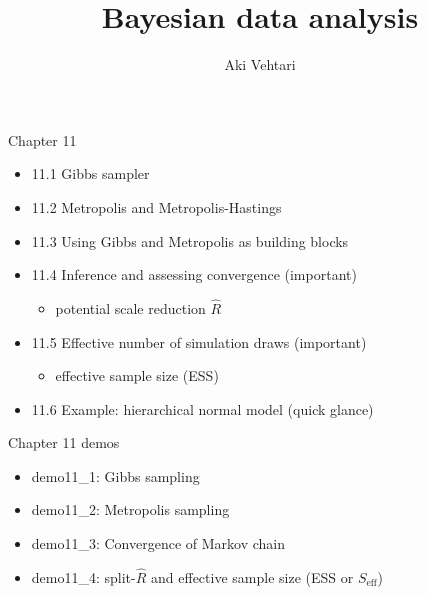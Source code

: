 \documentclass[finnish,english,t]{beamer}
\title[]{Bayesian data analysis}
\subtitle{}
\author{Aki Vehtari}
\institute[Aalto]{}
\begin{document}

\begin{frame}{Chapter 11}

  \begin{itemize}
  \item 11.1 Gibbs sampler
  \item 11.2 Metropolis and Metropolis-Hastings
  \item 11.3 Using Gibbs and Metropolis as building blocks
  \item 11.4 Inference and assessing convergence (important)
    \begin{itemize}
    \item potential scale reduction $\widehat{R}$
    \end{itemize}
  \item 11.5 Effective number of simulation draws (important)
    \begin{itemize}
    \item effective sample size (ESS)
    \end{itemize}
  \item 11.6 Example: hierarchical normal model (quick glance)
  \end{itemize}
\end{frame}

\begin{frame}{Chapter 11 demos}

  \begin{itemize}
\item demo11\_1: Gibbs sampling
\item demo11\_2: Metropolis sampling
\item demo11\_3: Convergence of Markov chain
\item demo11\_4: split-$\widehat{R}$ and effective sample size (ESS or $S_{\mathrm{eff}}$)
\end{itemize}

\end{frame}
\end{document}
